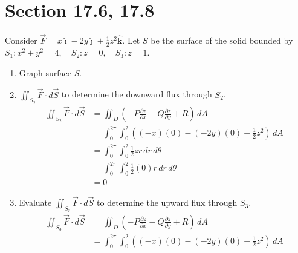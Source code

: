 \documentclass[letter,11pt]{article}
\begin{document}
\section*{Section 17.6, 17.8}
Consider $\vec{F}=x \boldsymbol{\hat\imath}-2 y \boldsymbol{\hat\jmath}+\frac{1}{2} z^{2} \boldsymbol{\hat k}$. Let $S$ be the surface of the solid bounded by $S_{1}: x^{2}+y^{2}=4, \quad S_{2}: z=0, \quad S_{3}: z=1$.
\begin{enumerate}[label = \alph*.]
    \item Graph surface $S$.
    \begin{figure}[h]
        \centering
    \end{figure}
    \item $\iint_{S_{2}} \vec{F} \cdot d \vec{S}$ to determine the downward flux through $S_{2}$.
    \begin{align*}
        \iint_{S_2} \vec{F}\cdot d\vec{S} &= \iint_{D} \left(-P \frac{\partial z}{\partial x}-Q \frac{\partial z}{\partial y}+R\right)\, dA\\
        &= \int_{0}^{2\pi}\int_{0}^{2} \left((-x)(0)-(-2y)(0)+\frac{1}{2}z^{2}\right)\, dA\\
        &= \int_{0}^{2\pi}\int_{0}^{2} \frac{1}{2}z r\,dr\, d\theta\\
        &= \int_{0}^{2\pi}\int_{0}^{2} \frac{1}{2}\left(0\right) r\,dr\, d\theta\\
        &= \boxed{0}
    \end{align*}
    \item Evaluate $\iint_{S_{3}} \vec{F} \cdot d \vec{S}$ to determine the upward flux through $S_{3}$.
    \begin{align*}
        \iint_{S_3} \vec{F}\cdot d\vec{S} &= \iint_{D} \left(-P \frac{\partial z}{\partial x}-Q \frac{\partial z}{\partial y}+R\right)\, dA\\
        &= \int_{0}^{2\pi}\int_{0}^{2} \left((-x)(0)-(-2y)(0)+\frac{1}{2}z^{2}\right)\, dA\\

\end{align*}
\end{enumerate}
\end{document}

